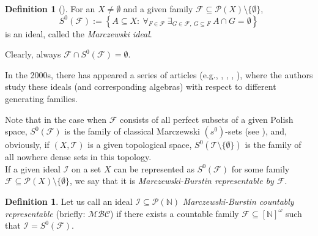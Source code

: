 \documentclass{amsart}
\theoremstyle{definition}
\newtheorem{df}[thm]{Definition}
\theoremstyle{definition}
\newcommand{\N}{{\mathbb N}}
\newcommand{\I}{\mathcal I}
\newcommand{\J}{\mathcal J}
\newcommand{\T}{\mathcal{T}}
\newcommand{\InfSubs}{[\N]^{\omega}}
\newcommand{\MB}{S^0}  %
\newcommand{\MBC}{\mathcal{MBC}}
\begin{document}
\begin{df}[\cite{MB}] 
For an $X\neq\emptyset$ and a given family $\mathcal{F}\subseteq \mathcal{P}(X)\setminus\{\emptyset\}$,
$$\MB(\mathcal{F}) := \left\{A\subseteq X :\ \forall_{F\in\mathcal{F}}\ \exists_{G\in\mathcal{F},\ G\subseteq F}\ A\cap G=\emptyset\right\}$$
is an ideal, called the \emph{Marczewski ideal}.
\end{df}

Clearly, always $\mathcal{F}\cap \MB(\mathcal{F})=\emptyset$.

In the 2000s, there has appeared a series of articles 
(e.g., \cite{MB}, \cite{MB2}, \cite{MB3}, \cite{MB4}), where the authors study these ideals (and corresponding algebras) with respect to different generating families.

Note that in the case when $\mathcal{F}$ consists of all perfect subsets of a given Polish space, $\MB(\mathcal{F})$ is the family of classical Marczewski $(s^0)$-sets (see \cite{Sz}), and, obviously, if $(X,\T)$ is a given topological space, $\MB(\T\setminus\{\emptyset\})$ is the family of all nowhere dense sets in this topology.\\

If a given ideal $\I$ on a set $X$ can be represented as $\MB(\mathcal{F})$ for some family $\mathcal{F}\subseteq \mathcal{P}(X)\setminus\{\emptyset\}$, we say that it is \emph{Marczewski-Burstin representable by $\mathcal{F}$}. 

\begin{df}
Let us call an ideal $\I\subseteq \mathcal{P}(\N)$ \emph{Marczewski-Burstin countably representable}
(briefly: $\MBC$) if there exists a countable family $\mathcal{F}\subseteq \InfSubs$ such that $\I = \MB(\mathcal{F})$.
\end{df}
\end{document}
